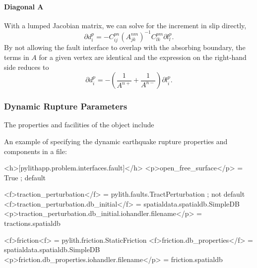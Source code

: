 \paragraph{Diagonal A}

With a lumped Jacobian matrix, we can solve for the increment in slip
directly,
\begin{equation}
\partial d_{i}^{p}=-C_{ij}^{pn}(A_{jk}^{nm})^{-1}C_{lk}^{pm}\partial l_{l}^{p}.
\end{equation}
By not allowing the fault interface to overlap with the absorbing
boundary, the terms in $A$ for a given vertex are identical and the
expression on the right-hand side reduces to
\begin{equation}
\partial d_{i}^{p}=-\left(\frac{1}{A^{n+}}+\frac{1}{A^{n-}}\right)\partial l_{i}^{p}.
\end{equation}

\subsubsection{Dynamic Rupture Parameters}

The properties and facilities of the  object include
\begin{inventory}
\end{inventory}
An example of specifying the dynamic earthquake rupture properties
and components in a  file:
\begin{cfg}
<h>[pylithapp.problem.interfaces.fault]</h>
<p>open_free_surface</p> = True ; default

<f>traction_perturbation</f> = pylith.faults.TractPerturbation ; not default
<f>traction_perturbation.db_initial</f> = spatialdata.spatialdb.SimpleDB
<p>traction_perturbation.db_initial.iohandler.filename</p> = tractions.spatialdb

<f>friction<f> = pylith.friction.StaticFriction
<f>friction.db_properties</f> = spatialdata.spatialdb.SimpleDB
<p>friction.db_properties.iohandler.filename</p> = friction.spatialdb
\end{cfg}

